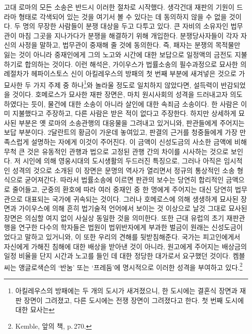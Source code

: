 고대 로마의 모든 소송은 반드시 이러한 절차로 시작했다.
생각건대
재판의 기원이 드라마 형태로 각색되어 있는 것을
여기서
볼 수 있다는 데
동의하지 않을 수 없을 것이다.
두 명의 무장한 사람들이 분쟁 대상을 두고 다투고 있다.
큰 자비의 소유자인 법무관이 마침
그곳을 지나가다가 분쟁을 해결하기 위해 개입한다.
분쟁당사자들이 각자 자신의 사정을 말하고,
법무관이 중재해 줄 것에 동의한다.
즉, 패자는 분쟁의 목적물만 잃는 것이 아니라
중재인에게 그의 노고와 시간에 대한 보답으로
일정액의 금전도 지불하기로 합의하는 것이다.
이런 해석은,
가이우스가 법률소송의 필수과정으로 묘사한
의례절차가
헤파이스토스 신이
아킬레우스의 방패의 첫 번째 부분에 새겨넣은 것으로
가 묘사한
두 가지 주제 중 하나\footnote{%
  아킬레우스의 방패에는 두 개의 도시가 새겨졌으니,
  한 도시에는 결혼식 장면과 재판 장면이 그려졌고,
  다른 도시에는 전쟁 장면이 그려졌다고 한다.
  첫 번째 도시에 대한 묘사는
}와
놀라울 정도로 일치하지 않았다면,
설득력이 반감되었을 것이다.
호메로스가 묘사한 재판 장면은,
마치 원시사회의 성격을 드러내고자 의도하였다는 듯이,
물건에 대한 소송이 아니라
살인에 대한 속죄금 소송이다.
한 사람은 이미 지불했다고 주장하고,
다른 사람은 받은 적이 없다고 주장한다.
하지만 상세하게 묘사된 부분은
옛 로마의 소송관행의 대응물을 그려내고 있거니와,
판관들에게 주어지는 보답 부분이다.
2달란트의 황금이 가운데 놓여있고,
판결의 근거를 청중들에게 가장 만족스럽게 설명하는 자에게
이것이 주어진다.
이 금액이 신성도금의 사소한 금액에 비해 무척 큰 것은
유동적인 관행과 법으로 고정된 관행 간의 차이를 시사하는 것으로 보인다.
저 시인에 의해
영웅시대의 도시생활의 두드러진 특징으로,
그러나 아직은 임시적인 성격의 것으로
소개된 이 장면은
문명의 역사가 열리면서
정규의 통상적인 소송 형식으로 굳어져간다.
따라서
법률소송에 이르면 판관의 보수는
당연히 합리적인 금액으로 줄어들고,
군중의 환호에 따라 여러 중재인 중 한 명에게 주어지는 대신
당연히 법무관으로 대표되는 국가에 귀속되는 것이다.
그러나
호메로스에 의해 생생하게 묘사된 장면과
가이우스에 의해
흔히 법기술적 언어에서 보이는 것 이상으로 날것 그대로
묘사된 장면은 의심할 여지 없이
사실상 동일한 것을 의미한다.
또한
근대 유럽의 초기 재판관행을 연구한 다수의 학자들은
법원이 법위반자에게 부과한 벌금이 원래는 신성도금이었다고
말하고 있거니와, 이 또한
우리의 견해를 뒷받침해준다.
국가는
피고인에게서
자신에게 가해진 침해에 대한 배상을
받아낸 것이 아니라,
원고에게 주어지는 배상금의 일정 비율을
단지
시간과 노고를 들인 데 대한 정당한 대가로서
요구했던 것이다.
켐블 씨는 앵글로색슨의
`반눔' 또는 `프레둠'에
명시적으로
이러한 성격을
부여하고 있다.\footnote{Kemble, 앞의 책, p.\,270.}

